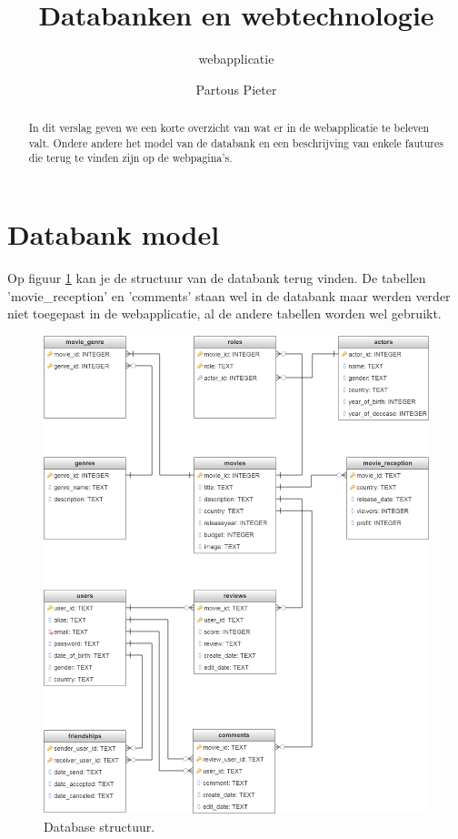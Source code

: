 \documentclass[12px]{article}
\title{Databanken en webtechnologie}
\subtitle{webapplicatie}
\author{Partous Pieter}
\begin{document}
\maketitle
\begin{abstract}
In dit verslag geven we een korte overzicht van wat er in de webapplicatie te beleven valt. Ondere andere het model van de databank en een beschrijving van enkele fautures die terug te vinden zijn op de webpagina's.
\end{abstract}

\section{Databank model}
Op figuur \ref{graph1} kan je de structuur van de databank terug vinden. De tabellen 'movie\_reception' en 'comments' staan wel in de databank maar werden verder niet toegepast in de webapplicatie, al de andere tabellen worden wel gebruikt.
\begin{figure}[!hbp]
\includegraphics[width=\textwidth]{database-graph}
\caption{Database structuur.}
\label{graph1}
\end{figure}
\FloatBarrier
\end{document}
